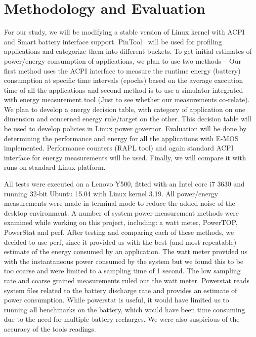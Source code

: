 \section{Methodology and Evaluation}\label{sec:meth}

For our study, we will be modifying a stable version of Linux kernel with ACPI and Smart battery interface support. PinTool~\cite{pin} will be used for profiling applications and categorize them into different buckets. To get initial estimates of power/energy consumption of applications, we plan to use two methods -- Our first method uses the ACPI interface to measure the runtime energy (battery) consumption at specific time intervals (epochs) based on the average execution time of all the applications and second method is to use a simulator integrated with energy measurement tool (Just to see whether our measurements co-relate). 
We plan to develop a energy decision table, with category of application on one dimension and concerned energy rule/target on the other. This decision table will be used to develop policies in Linux power governor.  
Evaluation will be done by determining the performance and energy for all the applications with E-MOS implemented. Performance counters (RAPL tool) and again standard ACPI interface for energy measurements will be used.
Finally, we will compare it with runs on standard Linux platform. 
\fi

All tests were executed on a Lenovo Y500, fitted with an Intel core i7 3630 and running 32-bit Ubuntu 15.04 with Linux kernel 3.19. All power/energy measurements were made in terminal mode to reduce the added noise of the desktop environment. A number of system power measurement methods were examined while working on this project, including: a watt meter, PowerTOP, PowerStat and perf. After testing and comparing each of these methods, we decided to use perf, since it provided us with the best (and most repeatable) estimate of the energy consumed by an application. The watt meter provided us with the instantaneous power consumed by the system but we found this to be too coarse and were limited to a sampling time of 1 second. The low sampling rate and coarse grained measurements ruled out the watt meter. Powerstat reads system files related to the battery discharge rate and provides an estimate of power consumption. While powerstat is useful, it would have limited us to running all benchmarks on the battery, which would have been time consuming due to the need for multiple battery recharges. We were also suspicious of the accuracy of the tools readings.

